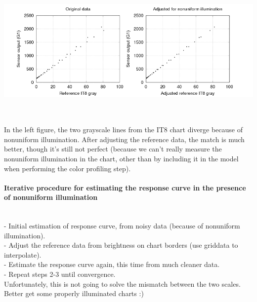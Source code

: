 \begin{center}
\includegraphics[height=7cm]{images/it8_lum_check}
\end{center}

In the left figure, the two grayscale lines from the IT8 chart diverge because of nonuniform illumination. After adjusting the reference data, the match is much better, though it's still not perfect (because we can't really measure the nonuniform illumination in the chart, other than by including it in the model when performing the color profiling step).\\

\paragraph{Iterative procedure for estimating the response curve in the presence of nonuniform illumination}\mbox{}\\

- Initial estimation of response curve, from noisy data (because of nonuniform illumination).\\
- Adjust the reference data from brightness on chart borders (use griddata to interpolate).\\
- Estimate the response curve again, this time from much cleaner data.\\
- Repeat steps 2-3 until convergence.\\ 

Unfortunately, this is not going to solve the mismatch between the two scales. Better get some properly illuminated charts :) 

